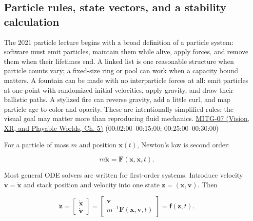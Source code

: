 \subsection{Particle rules, state vectors, and a stability calculation}\label{04-visual-computing-ii-ch029-particle-rules-state-vectors-and-a-stability-calculation}

The 2021 particle lecture begins with a broad definition of a particle system: software must emit particles, maintain them while alive, apply forces, and remove them when their lifetimes end. A linked list is one reasonable structure when particle counts vary; a fixed-size ring or pool can work when a capacity bound matters. A fountain can be made with no interparticle forces at all: emit particles at one point with randomized initial velocities, apply gravity, and draw their ballistic paths. A stylized fire can reverse gravity, add a little curl, and map particle age to color and opacity. These are intentionally simplified rules: the visual goal may matter more than reproducing fluid mechanics. \href{../07-Vision-XR-and-Playable-Worlds/main.pdf\#nameddest=04-visual-computing-ii-ch036-mitg-07---particle-systems}{MITG-07 (Vision, XR, and Playable Worlds, Ch. 5)} (00:02:00--00:15:00; 00:25:00--00:30:00)

For a particle of mass \(m\) and position \(\boldsymbol{x}(t)\), Newton's law is second order:

\[
m\ddot{\boldsymbol{x}}=\boldsymbol{F}(\boldsymbol{x},\dot{\boldsymbol{x}},t).
\]

Most general ODE solvers are written for first-order systems. Introduce velocity \(\boldsymbol{v}=\dot{\boldsymbol{x}}\) and stack position and velocity into one state \(\boldsymbol{z}=(\boldsymbol{x},\boldsymbol{v})\). Then

\[
\dot{\boldsymbol{z}}=
\begin{bmatrix}\dot{\boldsymbol{x}}\\\dot{\boldsymbol{v}}\end{bmatrix}
=\begin{bmatrix}\boldsymbol{v}\\m^{-1}\boldsymbol{F}(\boldsymbol{x},\boldsymbol{v},t)\end{bmatrix}
=\boldsymbol{f}(\boldsymbol{z},t).
\]

